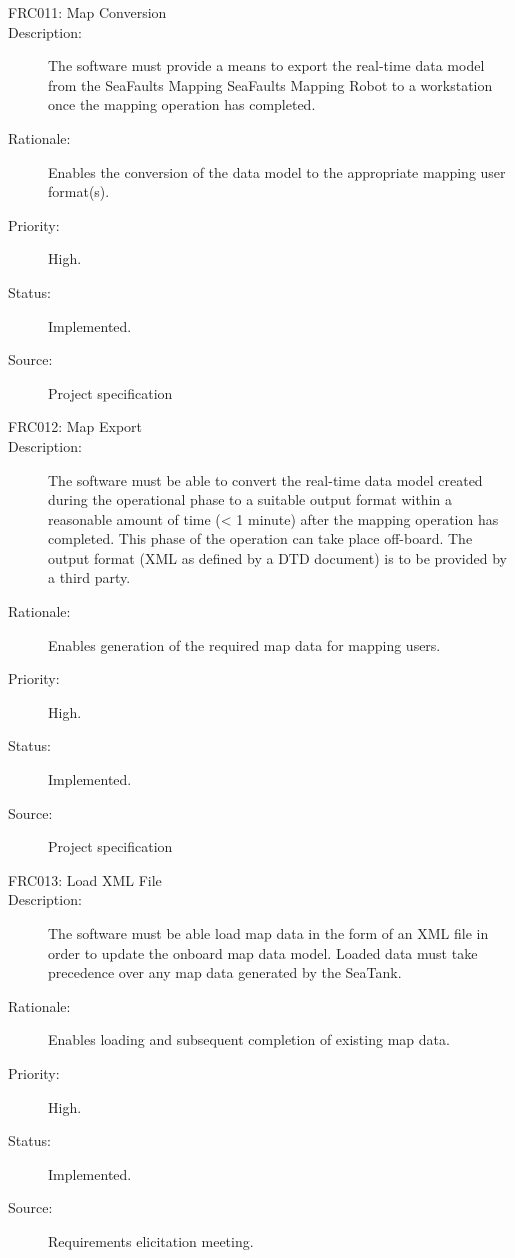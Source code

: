 \documentclass[12pt]{article}
\begin{document}
\begin{description}
\item [{FRC011: Map Conversion}\label{FRC011}] 
\item [{Description: }\label{Description}] The software must provide a means to export the real-time data model from the SeaFaults Mapping SeaFaults Mapping Robot to a workstation once the mapping operation has completed.
\item[{Rationale: }\label{Rationale}] Enables the conversion of the data model to the appropriate mapping user format(s).
\item[{Priority: }\label{Priority}] High.
\item[{Status: }\label{Status}] Implemented.
\item[{Source: }\label{Source}] Project specification \cite{spec}

\item [{FRC012: Map Export}\label{FRC012}]
\item [{Description: }\label{Description}] The software must be able to convert the real-time data model created during the operational phase to a suitable output format within a reasonable amount of time (< 1 minute) after the mapping operation has completed. This phase of the operation can take place off-board. The output format (XML as defined by a DTD document) is to be provided by a third party. 
\item[{Rationale: }\label{Rationale}] Enables generation of the required map data for mapping users.
\item[{Priority: }\label{Priority}] High.
\item[{Status: }\label{Status}] Implemented.
\item[{Source: }\label{Source}] Project specification \cite{spec}

\item [{FRC013: Load XML File}\label{FRC013}] 
\item [{Description: }\label{Description}] The software must be able load map data in the form of an XML file in order to update the onboard map data model. Loaded data must take precedence over any map data generated by the SeaTank. 
\item[{Rationale: }\label{Rationale}] Enables loading and subsequent completion of existing map data.
\item[{Priority: }\label{Priority}] High.
\item[{Status: }\label{Status}] Implemented.
\item[{Source: }\label{Source}] Requirements elicitation meeting.


\end{description}
\end{document}
